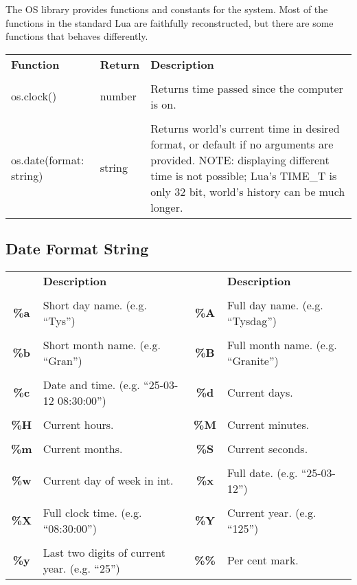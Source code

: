The OS library provides functions and constants for the system. Most of the functions in the standard Lua are faithfully reconstructed, but there are some functions that behaves differently.

\begin{tabularx}{\textwidth}{l l X}
	\textbf{\large Function} & \textbf{\large Return} & \textbf{\large Description}
	\\ \\
	\endhead
	os.clock() & number & Returns time passed since the computer is on.
	\\ \\
	os.date(format: string) & string & Returns world's current time in desired format, or default if no arguments are provided. NOTE: displaying different time is not possible; Lua's TIME\_T is only 32 bit, world's history can be much longer.
\end{tabularx}

\subsection{Date Format String}

\begin{tabularx}{\textwidth}{c X c X}
	\textbf{\large } & \textbf{\large Description} & \textbf{\large } & \textbf{\large Description}
	\\ \\
	\endhead
	\textbf{\%a} & Short day name. (e.g. ``Tys'') & \textbf{\%A} & Full day name. (e.g. ``Tysdag'')
	\\ \\
	\textbf{\%b} & Short month name. (e.g. ``Gran'') & \textbf{\%B} & Full month name. (e.g. ``Granite'')
	\\ \\
	\textbf{\%c} & Date and time. (e.g. ``25-03-12 08:30:00'') & \textbf{\%d} & Current days.
	\\ \\
	\textbf{\%H} & Current hours. & \textbf{\%M} & Current minutes.
	\\ \\
	\textbf{\%m} & Current months. & \textbf{\%S} & Current seconds.
	\\ \\
	\textbf{\%w} & Current day of week in int. & \textbf{\%x} & Full date. (e.g. ``25-03-12'')
	\\ \\
	\textbf{\%X} & Full clock time. (e.g. ``08:30:00'') & \textbf{\%Y} & Current year. (e.g. ``125'')
	\\ \\
	\textbf{\%y} & Last two digits of current year. (e.g. ``25'') & \textbf{\%\%} & Per cent mark.
\end{tabularx}